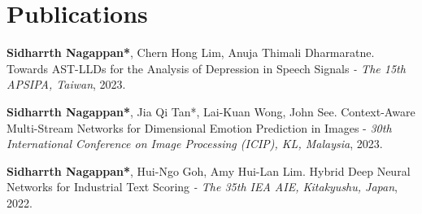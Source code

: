 \documentclass[]{resume-openfont}
\begin{document}


\section{Publications}
\sectionsep
\begin{tightemize}

  \item \textbf{Sidharrth Nagappan*}, Chern Hong Lim, Anuja Thimali Dharmaratne. Towards AST-LLDs for the Analysis of Depression in Speech Signals \textit{- The 15th APSIPA, Taiwan}, 2023. \href{https://ieeexplore.ieee.org/document/10317141}{}
  \item \textbf{Sidharrth Nagappan*}, Jia Qi Tan*, Lai-Kuan Wong, John See. Context-Aware Multi-Stream Networks for Dimensional Emotion Prediction in Images - \textit{30th International Conference on Image Processing (ICIP), KL, Malaysia}, 2023. \href{https://ieeexplore.ieee.org/stamp/stamp.jsp?arnumber=10221960}{}
  
  \item \textbf{Sidharrth Nagappan*}, Hui-Ngo Goh, Amy Hui-Lan Lim. Hybrid Deep Neural Networks for Industrial Text Scoring \textit{- The 35th IEA AIE, Kitakyushu, Japan}, 2022. \href{https://link.springer.com/chapter/10.1007/978-3-031-08530-7_58}{}

\end{tightemize}
\sectionsep
\end{document}
